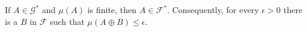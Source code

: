 If $A \in \mathcal{G}^*$ and $\mu(A)$ is finite, then $A \in \mathcal{F}^*$. Consequently, for every $\epsilon > 0$ there is a $B$ in $\mathcal{F}$ such that $\mu(A \oplus B) \leq \epsilon$.
